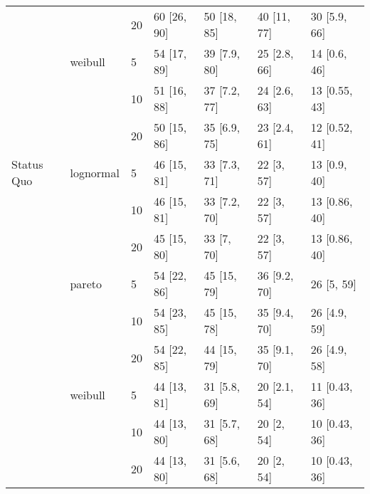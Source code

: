 \begin{tabular}{lllllll}
           &         & 20 &           60 [26, 90] &           50 [18, 85] &           40 [11, 77] &           30 [5.9, 66] \\
           & weibull & 5  &           54 [17, 89] &          39 [7.9, 80] &          25 [2.8, 66] &           14 [0.6, 46] \\
           &         & 10 &           51 [16, 88] &          37 [7.2, 77] &          24 [2.6, 63] &          13 [0.55, 43] \\
           &         & 20 &           50 [15, 86] &          35 [6.9, 75] &          23 [2.4, 61] &          12 [0.52, 41] \\
Status Quo & lognormal & 5  &           46 [15, 81] &          33 [7.3, 71] &            22 [3, 57] &           13 [0.9, 40] \\
           &         & 10 &           46 [15, 81] &          33 [7.2, 70] &            22 [3, 57] &          13 [0.86, 40] \\
           &         & 20 &           45 [15, 80] &            33 [7, 70] &            22 [3, 57] &          13 [0.86, 40] \\
           & pareto & 5  &           54 [22, 86] &           45 [15, 79] &          36 [9.2, 70] &             26 [5, 59] \\
           &         & 10 &           54 [23, 85] &           45 [15, 78] &          35 [9.4, 70] &           26 [4.9, 59] \\
           &         & 20 &           54 [22, 85] &           44 [15, 79] &          35 [9.1, 70] &           26 [4.9, 58] \\
           & weibull & 5  &           44 [13, 81] &          31 [5.8, 69] &          20 [2.1, 54] &          11 [0.43, 36] \\
           &         & 10 &           44 [13, 80] &          31 [5.7, 68] &            20 [2, 54] &          10 [0.43, 36] \\
           &         & 20 &           44 [13, 80] &          31 [5.6, 68] &            20 [2, 54] &          10 [0.43, 36] \\
\bottomrule
\end{tabular}
